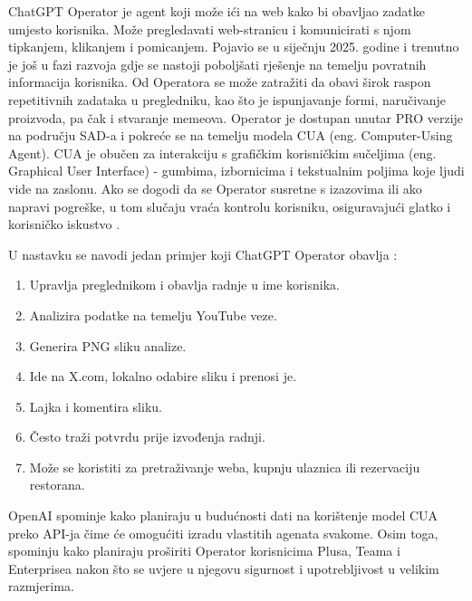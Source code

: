 \documentclass[]{foi}
\begin{document}
ChatGPT Operator je agent koji može ići na web kako bi obavljao zadatke umjesto korisnika. Može pregledavati web-stranicu i komunicirati s njom tipkanjem, klikanjem i pomicanjem.
Pojavio se u siječnju 2025. godine i trenutno je još u fazi razvoja gdje se nastoji poboljšati rješenje na temelju povratnih informacija korisnika. Od Operatora se može zatražiti da obavi
širok raspon repetitivnih zadataka u pregledniku, kao što je ispunjavanje formi, naručivanje proizvoda, pa čak i stvaranje memeova. Operator je dostupan unutar PRO verzije na području SAD-a i pokreće se
na temelju modela CUA (eng. Computer-Using Agent). CUA je obučen za interakciju s grafičkim korisničkim sučeljima (eng. Graphical User Interface) - gumbima, izbornicima i tekstualnim poljima koje ljudi vide na zaslonu.
Ako se dogodi da se Operator susretne s izazovima ili ako napravi pogreške, u tom slučaju vraća kontrolu korisniku, osiguravajući glatko i korisničko iskustvo \cite{openai2024operator}. 

U nastavku se navodi jedan primjer koji ChatGPT Operator obavlja \cite{rileybrown2025tiktok}:
\begin{enumerate}
    \item Upravlja preglednikom i obavlja radnje u ime korisnika.
    \item Analizira podatke na temelju YouTube veze.
    \item Generira PNG sliku analize.
    \item Ide na X.com, lokalno odabire sliku i prenosi je.
    \item Lajka i komentira sliku.
    \item Često traži potvrdu prije izvođenja radnji.
    \item Može se koristiti za pretraživanje weba, kupnju ulaznica ili rezervaciju restorana.
\end{enumerate}

OpenAI spominje kako planiraju u budućnosti dati na korištenje model CUA preko API-ja čime će omogućiti izradu vlastitih agenata svakome. Osim toga, spominju kako planiraju proširiti Operator
korisnicima Plusa, Teama i Enterprisea nakon što se uvjere u njegovu sigurnost i upotrebljivost u velikim razmjerima.
\newpage
\end{document}
